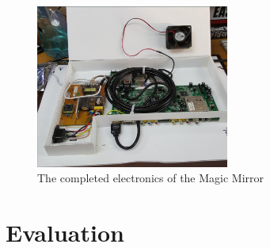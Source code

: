 \documentclass[conference]{IEEEtran}
\begin{document}
\begin{figure}[!ht]
\centering
\includegraphics[width=2.5in]{images/Electronics.png}
\caption{The completed electronics of the Magic Mirror}
\label{fig:elec}
\end{figure}


\section{Evaluation}
\end{document}
